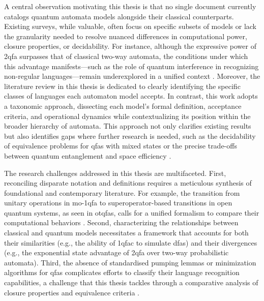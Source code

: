 A central observation motivating this thesis is that no single document currently catalogs quantum automata models alongside their classical counterparts. Existing surveys, while valuable, often focus on specific subsets of models or lack the granularity needed to resolve nuanced differences in computational power, closure properties, or decidability. For instance, although the expressive power of \gls{2qfa} surpasses that of classical two-way automata, the conditions under which this advantage manifests—such as the role of quantum interference in recognizing non-regular languages—remain underexplored in a unified context \cite{yakaryilmaz2010succinctness}. Moreover, the literature review in this thesis is dedicated to clearly identifying the specific classes of languages each automaton model accepts. In contrast, this work adopts a taxonomic approach, dissecting each model’s formal definition, acceptance criteria, and operational dynamics while contextualizing its position within the broader hierarchy of automata. This approach not only clarifies existing results but also identifies gaps where further research is needed, such as the decidability of equivalence problems for \glspl{qfa} with mixed states or the precise trade-offs between quantum entanglement and space efficiency \cite{hirvensalo2012quantum}.  

The research challenges addressed in this thesis are multifaceted. First, reconciling disparate notation and definitions requires a meticulous synthesis of foundational and contemporary literature. For example, the transition from unitary operations in \gls{mo-1qfa} to superoperator-based transitions in open quantum systems, as seen in \glspl{otqfa}, calls for a unified formalism to compare their computational behaviors \cite{bertoni2001quantum}. Second, characterizing the relationships between classical and quantum models necessitates a framework that accounts for both their similarities (e.g., the ability of \gls{1qfac} to simulate \glspl{dfa}) and their divergences (e.g., the exponential state advantage of \gls{2qfa} over two-way probabilistic automata). Third, the absence of standardised pumping lemmas or minimization algorithms for \glspl{qfa} complicates efforts to classify their language recognition capabilities, a challenge that this thesis tackles through a comparative analysis of closure properties and equivalence criteria \cite{ambainis1998one}.  

